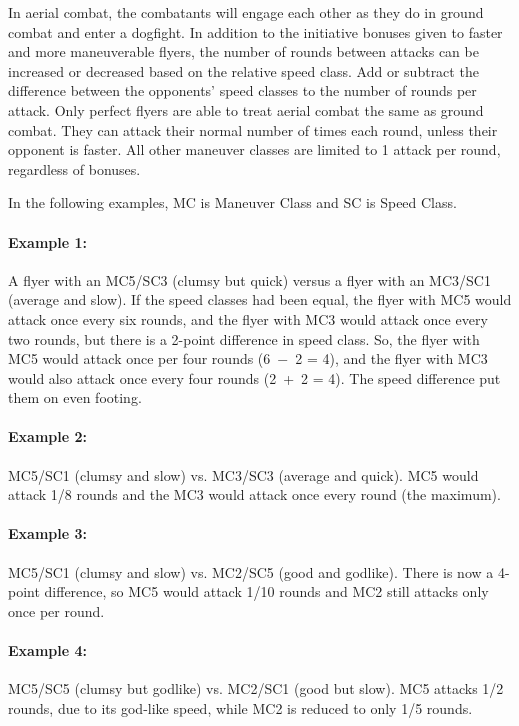 \begin{multicols}{2}
In aerial combat, the combatants will engage each other as they do in ground combat and enter a dogfight.  In addition to the initiative bonuses given to faster and more maneuverable flyers, the number of rounds between attacks can be increased or decreased based on the relative speed class.  Add or subtract the difference between the opponents' speed classes to the number of rounds per attack.  Only perfect flyers are able to treat aerial combat the same as ground combat.  They can attack their normal number of times each round, unless their opponent is faster.   All other maneuver classes are limited to 1 attack per round, regardless of bonuses.
 
In the following examples, MC is Maneuver Class and SC is Speed Class.
 
\paragraph{Example 1:} A flyer with an MC5/SC3 (clumsy but quick) versus a flyer with an MC3/SC1 (average and slow).  If the speed classes had been equal, the flyer with MC5 would attack once every six rounds, and the flyer with MC3 would attack once every two rounds, but there is a 2-point difference in speed class.  So, the flyer with MC5 would attack once per four rounds (6~$-$~2 = 4), and the flyer with MC3 would also attack once every four rounds (2~+~2 = 4).  The speed difference put them on even footing.
 
\paragraph{Example 2:} MC5/SC1 (clumsy and slow) vs. MC3/SC3 (average and quick).  MC5 would attack 1/8 rounds and the MC3 would attack once every round (the maximum).

\paragraph{Example 3:} MC5/SC1 (clumsy and slow) vs. MC2/SC5 (good and godlike).  There is now a 4-point difference, so MC5 would attack 1/10 rounds and MC2 still attacks only once per round.

\paragraph{Example 4:} MC5/SC5 (clumsy but godlike) vs. MC2/SC1 (good but slow).  MC5 attacks 1/2 rounds, due to its god-like speed, while MC2 is reduced to only 1/5 rounds.
 

\end{multicols}
